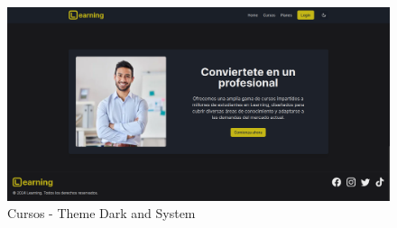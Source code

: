   \begin{figure}[H]
    \centering
    \includegraphics[width=1.0\textwidth]{img/C-DS4.png}
    \caption{Cursos - Theme Dark and System}
  \end{figure}
